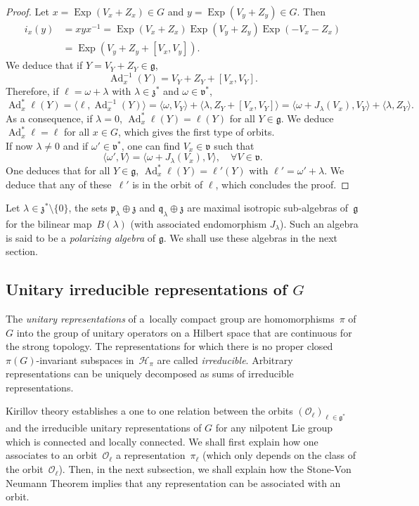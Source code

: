 \documentclass[10pt]{amsart}
\let\mathcal\mathscr
\DeclareMathOperator{\Ad}{Ad}
\DeclareMathOperator{\Exp}{Exp}
\theoremstyle{plain}
\theoremstyle{definition}
\begin{document}
\begin{proof}
Let $x=\Exp (V_x+ Z_x)\in G$ and $y=\Exp (V_y+ Z_y)\in G$. Then
\begin{align*}
i_x (y)& = x y x^{-1} = \Exp (V_x+Z_x)\Exp (V_y+Z_y) \Exp (- V_x - Z_x)\\
&= \Exp (V _y+ Z_y+[V_x,V_y]).
\end{align*}
We deduce that if $Y= V_Y+Z_Y\in\mathfrak g$,
\[
\Ad_x^{-1} (Y)= V_Y + Z_Y+[V_x,V_Y].
\]
Therefore, if $\ell= \omega+ \lambda$ with $\lambda \in \mathfrak z^*$ and $\omega \in \mathfrak v^*$,
\[
\Ad_x^*\ell (Y)= \langle \ell, \Ad_x^{-1} (Y)\rangle =\langle \omega, V_Y\rangle +\langle \lambda, Z_Y+[V_x,V_Y]\rangle =\langle \omega +J_\lambda(V_x),V_Y\rangle +\langle \lambda, Z_Y\rangle.
\]
As a consequence, if $\lambda=0$, $\Ad_x^*\ell (Y)=\ell(Y)$ for all $Y\in\mathfrak g$. We deduce $\Ad_x^*\ell=\ell $ for all $x\in G$, which gives the first type of orbits. \\
If now $\lambda\not=0$ and if $\omega'\in \mathfrak v^* $, one can find $V_x\in \mathfrak v$ such that
\[
\langle \omega', V\rangle =\langle \omega+J_\lambda(V_x),V\rangle,\quad \forall V\in \mathfrak v.
\]
One deduces that for all $Y\in \mathfrak g$, $\Ad_x^*\ell (Y)= \ell'(Y)$ with $\ell'= \omega'+\lambda$.
We deduce that any of these~$\ell'$ is in the orbit of $\ell$, which concludes the proof.
\end{proof}

Let $\lambda\in \mathfrak z^*\setminus\{0\}$, the sets $\mathfrak p_\lambda\oplus \mathfrak z $ and $\mathfrak q_\lambda \oplus \mathfrak z $ are maximal isotropic sub-algebras of~$\mathfrak g$ for the bilinear map~$B(\lambda)$ (with associated endomorphism $J_\lambda$). Such an algebra is said to be a \emph{polarizing algebra} of $\mathfrak g$. We shall use these algebras in the next section.

\subsection{Unitary irreducible representations of $G$} The \emph{unitary representations} of a~locally compact group are homomorphisms~$\pi$ of $G$ into the group of unitary operators on a Hilbert space that are continuous for the strong topology. The representations for which there is no proper closed $\pi(G)$-invariant subspaces in~${\mathcal H}_\pi$ are called \emph{irreducible}. Arbitrary representations can be uniquely decomposed as sums of irreducible representations.

Kirillov theory establishes a one to one relation between the orbits $(\mathcal O_\ell) _{\ell \in \mathfrak g^*}$ and the irreducible unitary representations of $G$ for any nilpotent Lie group which is connected and locally connected. We shall first explain how one associates to an orbit~$\mathcal O_\ell$ a representation~$\pi_\ell$ (which only depends on the class of the orbit~$\mathcal O_\ell$). Then, in the next subsection, we shall explain how the Stone-Von Neumann Theorem implies that any representation can be associated with an orbit.
\end{document}
